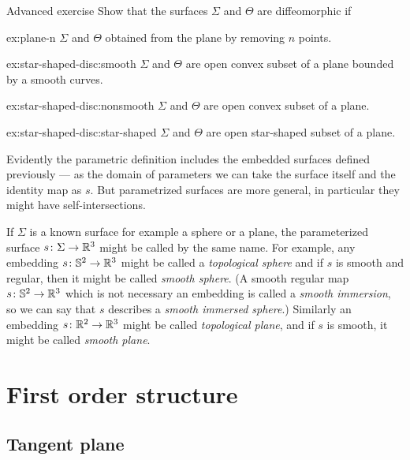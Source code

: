 \begin{thm}{Advanced exercise}\label{ex:star-shaped-disc}
Show that the surfaces $\Sigma$ and $\Theta$ are diffeomorphic if

\begin{subthm}{ex:plane-n}
$\Sigma$ and $\Theta$ obtained from the plane by removing $n$ points.
\end{subthm}


\begin{subthm}{ex:star-shaped-disc:smooth}
$\Sigma$ and $\Theta$ are open convex subset of a plane bounded by a smooth curves.
\end{subthm}


\begin{subthm}{ex:star-shaped-disc:nonsmooth}
$\Sigma$ and $\Theta$ are open convex subset of a plane.
\end{subthm}

\begin{subthm}{ex:star-shaped-disc:star-shaped}
$\Sigma$ and $\Theta$ are open star-shaped subset of a plane.
\end{subthm}
\end{thm}

Evidently the parametric definition includes the embedded surfaces defined previously --- as the domain of parameters we can take the surface itself and the identity map as $s$.
But parametrized surfaces are more general, in particular they  might  have self-intersections.

If $\Sigma$ is a known surface for example a sphere or a plane, the parameterized surface $s\colon\Sigma\to\mathbb{R}^3$ might be called by the same name.
For example, any embedding $s\colon\mathbb{S}^2\to\mathbb{R}^3$ might be called a \emph{topological sphere}
and if $s$ is smooth and regular, then it might be called \emph{smooth sphere}.
(A smooth regular map $s\colon\mathbb{S}^2\to\mathbb{R}^3$ which is not necessary an embedding is called a \emph{smooth immersion}, so we can say that $s$ describes a \emph{smooth immersed sphere}.) 
Similarly an embedding $s\colon\mathbb{R}^2\to\mathbb{R}^3$ might be called \emph{topological plane},
and if $s$ is smooth, it might be called \emph{smooth plane}.

\chapter{First order structure}

\section*{Tangent plane}

